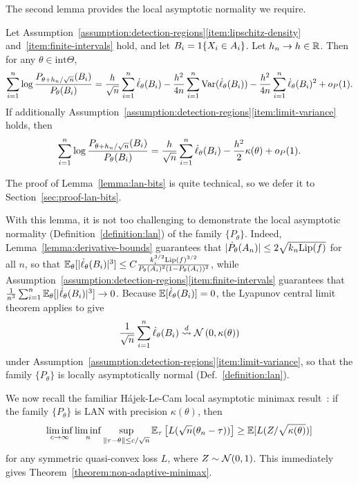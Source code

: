 The second lemma provides the local asymptotic normality we require.
\begin{lemma}
  \label{lemma:lan-bits}
  Let
  Assumption~\ref{assumption:detection-regions}\eqref{item:lipschitz-density}
  and~\eqref{item:finite-intervals} hold, and let $B_i = 1\!\left\{X_i \in
    A_i\right\}$.  Let $h_n \to h \in \mathbb{R}$. Then for any $\theta \in
  \mbox{int}\Theta$,
  \begin{equation*}
    \sum_{i = 1}^n \log \frac{P_{\theta + h_n/\sqrt{n}}(B_i)}{
      P_\theta(B_i)}
    = \frac{h}{\sqrt{n}}
    \sum_{i = 1}^n \dot{\ell}_\theta(B_i)
    - \frac{h^2}{4n} \sum_{i = 1}^n \textup{Var}(\dot{\ell}_\theta(B_i))
    - \frac{h^2}{4n} \sum_{i = 1}^n \dot{\ell}_\theta(B_i)^2
    + o_P(1).
  \end{equation*}
  If additionally
  Assumption~\ref{assumption:detection-regions}\eqref{item:limit-variance}
  holds, then
  \begin{equation*}
    \sum_{i = 1}^n \log \frac{P_{\theta + h_n/\sqrt{n}}(B_i)}{
      P_\theta(B_i)}
    = \frac{h}{\sqrt{n}}
    \sum_{i = 1}^n \dot{\ell}_\theta(B_i)
    - \frac{h^2}{2} \kappa(\theta) + o_P(1).
  \end{equation*}
\end{lemma}
\noindent
The proof of Lemma~\ref{lemma:lan-bits} is quite technical,
so we defer it to Section~\ref{sec:proof-lan-bits}.

With this lemma, it is not too challenging to demonstrate the local
asymptotic normality (Definition~\ref{definition:lan}) of the family
$\{P_\theta\}$. Indeed, Lemma~\ref{lemma:derivative-bounds} guarantees that
$|\dot{P}_\theta(A_n)| \le 2\sqrt{k_n {\rm \textup{Lip}}(f)}$ for all $n$, so that
$\mathbb{E}_\theta[|\dot{\ell}_\theta(B_i)|^3] \le C \frac{k_i^{3/2}
  {\rm \textup{Lip}}(f)^{3/2}}{P_\theta(A_i)^2 (1 - P_\theta(A_i))^2}$, while
Assumption~\ref{assumption:detection-regions}\eqref{item:finite-intervals}
guarantees that
$\frac{1}{n^3} \sum_{i = 1}^n \mathbb{E}_\theta[|\dot{\ell}_\theta(B_i)|^3]
\to 0$. Because $\mathbb{E}[\dot{\ell}_\theta(B_i)] = 0$,
the Lyapunov central limit theorem
applies to give
\begin{equation*}
  \frac{1}{\sqrt{n}} \sum_{i = 1}^n \dot{\ell}_\theta(B_i)
  \stackrel{d}{\rightsquigarrow} \mathcal{N}\left(0, \kappa(\theta)\right)
\end{equation*}
under
Assumption~\ref{assumption:detection-regions}\eqref{item:limit-variance},
so that the family $\{P_\theta\}$ is locally asymptotically normal
(Def.~\ref{definition:lan}).

We now recall the familiar H\'{a}jek-Le-Cam local asymptotic minimax
result~\cite[Thm.~8.11]{VanDerVaart98}: if the family
$\{P_\theta\}$ is LAN with precision $\kappa(\theta)$, then
\begin{equation*}
  \liminf_{c \to \infty} \liminf_n \sup_{\left\|{\tau - \theta}\right\| \le
    c / \sqrt{n}} \mathbb{E}_\tau\left[L(\sqrt{n}(\theta_n - \tau))\right]
  \ge \mathbb{E}[L(Z / \sqrt{\kappa(\theta)})]
\end{equation*}
for any symmetric quasi-convex loss $L$, where $Z \sim \mathcal{N}(0, 1)$.
This immediately gives Theorem~\ref{theorem:non-adaptive-minimax}.

